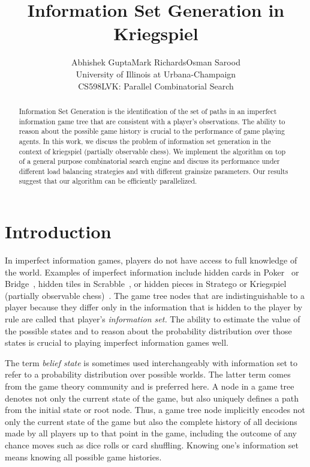 \documentclass[11pt]{article}
\begin{document}
\title{Information Set Generation in Kriegspiel}
\author{Abhishek Gupta\qquad Mark Richards\qquad Osman Sarood\\University of Illinois at Urbana-Champaign\\CS598LVK:
Parallel Combinatorial Search} \maketitle

\begin{abstract}
Information Set Generation is the identification of the set of paths in an imperfect information game tree that are
consistent with a player's observations.  The ability to reason about the possible game history is crucial to the
performance of game playing agents.  In this work, we discuss the problem of information set generation in the context
of kriegspiel (partially observable chess).  We implement the algorithm on top of a general purpose combinatorial search
engine and discuss its performance under different load balancing strategies and with different grainsize parameters.
Our results suggest that our algorithm can be efficiently parallelized.  \end{abstract}

\section{Introduction}
In imperfect information games, players do not have access to full knowledge of the world. Examples of imperfect
information include hidden cards in Poker~\cite{billings02challenge} or Bridge~\cite{ginsberg96partition}, hidden tiles
in Scrabble~\cite{richards07opponent}, or hidden pieces in Stratego or Kriegspiel (partially observable
chess)~\cite{li94chess}. The game tree nodes that are indistinguishable to a player because they differ only in the
information that is hidden to the player by rule are called that player's {\em information set.}  The ability to
estimate the value of the possible states and to reason about the probability distribution over those states is crucial
to playing imperfect information games well. 

The term {\em belief state} is sometimes used interchangeably with information set to refer to a probability
distribution over possible worlds.  The latter term comes from the game theory community and is preferred here.  A node
in a game tree denotes not only the current state of the game, but also uniquely defines a path from the initial state
or root node.  Thus, a game tree node implicitly encodes not only the current state of the game but also the complete
history of all decisions made by all players up to that point in the game, including the outcome of any chance moves
such as dice rolls or card shuffling.  Knowing one's information set means knowing all possible game histories.
\end{document}
